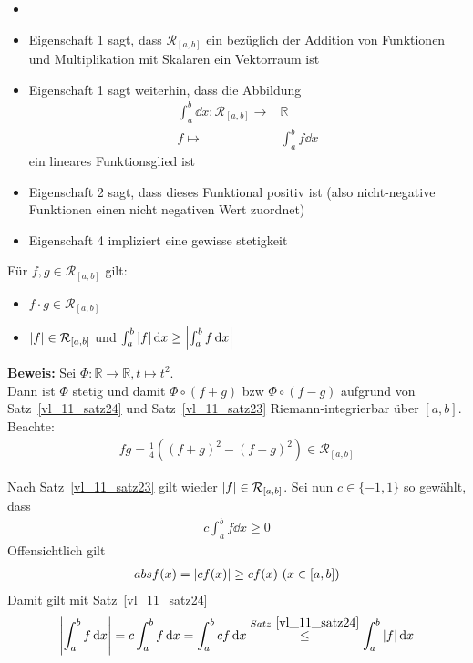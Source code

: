 \begin{Bemerkung}{
	\begin{itemize}
	 	\item[ ]
		\item Eigenschaft 1 sagt, dass $\mathcal{R}_{[a,b]}$ ein bezüglich der Addition von 
		Funktionen und Multiplikation mit Skalaren ein Vektorraum ist
		\item Eigenschaft 1 sagt weiterhin, dass die Abbildung 
		\begin{align*}
			\int_a^b \dd{x} : \mathcal{R}_{[a,b]} \rightarrow  & \mathbb{R} \\
			f \mapsto & \int_a^b f\dd{x}
		\end{align*}
		ein lineares Funktionsglied ist
		\item Eigenschaft 2 sagt, dass dieses Funktional positiv ist
		(also nicht-negative Funktionen einen nicht negativen Wert zuordnet)
		\item Eigenschaft 4 impliziert eine gewisse stetigkeit
	\end{itemize}
}\end{Bemerkung}

\begin{Satz}{
	Für $f,g \in \mathcal{R}_{[a,b]}$ gilt:
	\begin{itemize}
		\item $f \cdot g \in \mathcal{R}_{[a,b]}$
		\item $\abs{f} \in \mathcal{R}_{[a,b]}$ und $\int_a^b \abs{f} \dd{x} 
		\geq \abs{\int_a^b f \dd{x}}$
	\end{itemize}
	\textbf{Beweis:}
	Sei $\Phi : \mathbb{R} \rightarrow  \mathbb{R}, t \mapsto t^2$. \\
	Dann ist
	$\Phi$ stetig und damit $\Phi \circ (f+g) $ bzw $\Phi \circ (f -g)$ 
	aufgrund von Satz~\ref{vl_11_satz24} und Satz~\ref{vl_11_satz23}
	Riemann-integrierbar über $[a,b]$.
	Beachte: 
	\begin{align*}
		f g = \frac{1}{4} ((f + g)^2 - (f-g)^2) \in \mathcal{R}_{[a,b]}
	\end{align*}
	\item Nach Satz~\ref{vl_11_satz23}
	gilt wieder $\abs{f} \in \mathcal{R}_{[a,b]}$. Sei nun $c \in \{-1, 1\}$ so 
	gewählt, dass 
	\begin{align*}
		c \int_a^b f \dd{x} \geq 0
	\end{align*}
	Offensichtlich gilt 
	\begin{align*}
		abs{f(x)} = \abs{c f(x)} \geq c f(x) \text{ } (x \in [a,b])
	\end{align*}
	Damit gilt mit Satz~\ref{vl_11_satz24}
	\begin{align*}
		\abs{\int_a^b f\dd{x}} = c \int_a^b f\dd{x} = \int_a^b cf \dd{x} 
		\overset{Satz~\ref{vl_11_satz24}}{\le} \int_a^b \abs{f}\dd{x}
	\end{align*}
}\end{Satz}

